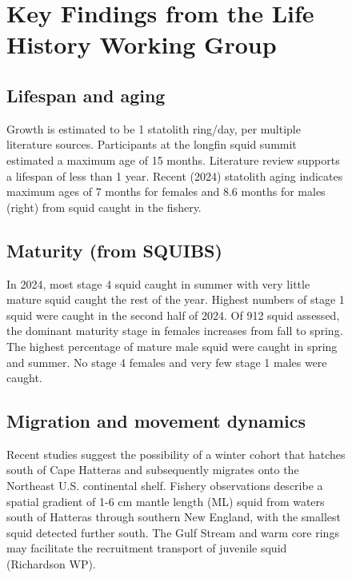 \documentclass[
  8.5pt,
  letterpaper,
  DIV=11,
  numbers=noendperiod]{scrartcl}
\begin{document}
\begin{figure}

\begin{minipage}{0.57\linewidth}

\raggedright
\section{Key Findings from the Life History Working Group}

\subsection{Lifespan and aging}

Growth is estimated to be 1 statolith ring/day, per multiple literature
sources. Participants at the longfin squid summit estimated a maximum
age of 15 months. Literature review supports a lifespan of less than 1
year. Recent (2024) statolith aging indicates maximum ages of 7 months
for females and 8.6 months for males (right) from squid caught in the
fishery.

\vspace{0.25cm}

\subsection{Maturity (from SQUIBS)}

In 2024, most stage 4 squid caught in summer with very little mature
squid caught the rest of the year. Highest numbers of stage 1 squid were
caught in the second half of 2024. Of 912 squid assessed, the dominant
maturity stage in females increases from fall to spring. The highest
percentage of mature male squid were caught in spring and summer. No
stage 4 females and very few stage 1 males were caught.

\vspace{0.25cm}

\subsection{Migration and movement dynamics}

Recent studies suggest the possibility of a winter cohort that hatches
south of Cape Hatteras and subsequently migrates onto the Northeast U.S.
continental shelf. Fishery observations describe a spatial gradient of
1-6 cm mantle length (ML) squid from waters south of Hatteras through
southern New England, with the smallest squid detected further south.
The Gulf Stream and warm core rings may facilitate the recruitment
transport of juvenile squid (Richardson WP).


\end{minipage}
\end{figure}
\end{document}
